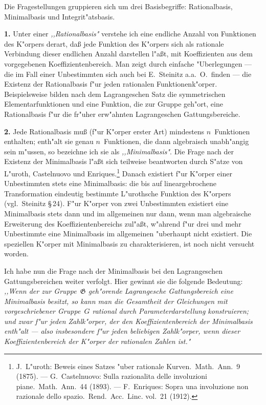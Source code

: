 \documentclass[11pt,a4paper]{article}
\begin{document}
Die Fragestellungen gruppieren sich um drei Basisbegriffe: Rationalbasis,
Minimalbasis und Integrit"{a}tsbasis.

\smallskip
\noindent
\textbf{1.} Unter einer \emph{,,Rationalbasis"{}} verstehe ich eine endliche Anzahl
von Funktionen des K"{o}rpers derart, da\ss{} jede Funktion des K"{o}rpers
sich als rationale Verbindung dieser endlichen Anzahl darstellen
l"{a}\ss{}t, mit Koeffizienten aus dem vorgegebenen Koeffizientenbereich. Man
zeigt durch einfache "{U}berlegungen --- die im Fall einer Unbestimmten
sich auch bei E.~Steinitz a.a.\ O.\ finden --- die Existenz der
Rationalbasis f"{u}r jeden rationalen Funktionenk"{o}rper. Beispielsweise bilden nach
dem Lagrangeschen Satz die symmetrischen Elementarfunktionen und
eine Funktion, die zur Gruppe geh"{o}rt, eine Rationalbasis f"{u}r die fr"{u}her
erw"{a}hnten Lagrangeschen Gattungsbereiche.

\smallskip
\noindent
\textbf{2.} Jede Rationalbasis mu\ss{} (f"{u}r K"{o}rper erster Art) mindestens
$n$~Funktionen enthalten; enth"{a}lt sie genau $n$~Funktionen, die dann
algebraisch unabh"{a}ngig sein m"{u}ssen, so bezeichne ich sie als \emph{,,Minimalbasis"{}}.
Die Frage nach der Existenz der Minimalbasis l"{a}\ss{}t sich teilweise
beantworten durch S"{a}tze von L"{u}roth, Castelnuovo und Enriques.\footnote{J.~L"{u}roth: Beweis eines Satzes "{u}ber rationale Kurven.\ Math.\ Ann.\ 9 (1875). ---
G.~Castelnuovo: Sulla razionalita delle involuzioni piane.\ Math.\ Ann.\ 44 (1893). ---
F.~Enriques: Sopra una involuzione non razionale dello spazio.\ Rend.\ Acc.\ Linc.
vol.\ 21 (1912).}
Danach existiert f"{u}r K"{o}rper einer Unbestimmten stets eine
Minimalbasis: die bis auf lineargebrochene Transformation eindeutig
bestimmte L"{u}rothsche Funktion des K"{o}rpers (vgl.\ Steinitz \S\,24).
F"{u}r K"{o}rper von zwei Unbestimmten existiert eine Minimalbasis stets
dann und im allgemeinen nur dann, wenn man algebraische Erweiterung
des Koeffizientenbereichs zul"{a}\ss{}t, w"{a}hrend f"{u}r drei und mehr Unbestimmte
eine Minimalbasis im allgemeinen "{u}berhaupt nicht existiert.
Die speziellen K"{o}rper mit Minimalbasis zu charakterisieren, ist noch
nicht versucht worden.

Ich habe nun die Frage nach der Minimalbasis bei den Lagrangeschen
Gattungsbereichen weiter verfolgt. Hier gewinnt sie die folgende
Bedeutung: \emph{,,Wenn der zur Gruppe~$\mathfrak{G}$ geh"{o}rende Lagrangesche
Gattungsbereich eine Minimalbasis besitzt, so kann man die
Gesamtheit der Gleichungen mit vorgeschriebener Gruppe~$G$
rational durch Parameterdarstellung konstruieren; und zwar
f"{u}r jeden Zahlk"{o}rper, der den Koeffizientenbereich der Minimalbasis
enth"{a}lt --- also insbesondere f"{u}r jeden beliebigen Zahlk"{o}rper,
wenn dieser Koeffizientenbereich der K"{o}rper der rationalen Zahlen
ist."{}}
\end{document}
